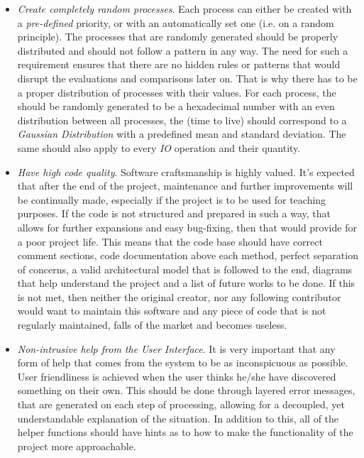 \documentclass{article}
\newcommand{\code}[1]{\codeinline{\texttt{#1}}}
\begin{document}
\begin{itemize}
\item \textit{Create completely random processes}. Each process can either be created with a \textit{pre-defined} priority, or with an automatically set one (i.e. on a random principle). The processes that are randomly generated should be properly distributed and should not follow a pattern in any way. The need for such a requirement ensures that there are no hidden rules or patterns that would disrupt the evaluations and comparisons later on. That is why there has to be a proper distribution of processes with their values. For each process, the \code{ID} should be randomly generated to be a hexadecimal number with an even distribution between all processes, the \code{ttl} (time to live) should correspond to a \textit{Gaussian Distribution} with a predefined mean and standard deviation. The same should also apply to every \textit{IO} operation and their quantity.

\item \textit{Have high code quality}. Software craftsmanship is highly valued. It's expected that after the end of the project, maintenance and further improvements will be continually made, especially if the project is to be used for teaching purposes. If the code is not structured and prepared in such a way, that allows for further expansions and easy bug-fixing, then that would provide for a poor project life. This means that the code base should have correct comment sections, code documentation above each method, perfect separation of concerns, a valid architectural model that is followed to the end, diagrams that help understand the project and a list of future works to be done. If this is not met, then neither the original creator, nor any following contributor would want to maintain this software and any piece of code that is not regularly maintained, falls of the market and becomes useless.

\item \textit{Non-intrusive help from the User Interface}. It is very important that any form of help that comes from the system to be as inconspicuous as possible. User friendliness is achieved when the user thinks he/she have discovered something on their own. This should be done through layered error messages, that are generated on each step of processing, allowing for a decoupled, yet understandable explanation of the situation. In addition to this, all of the helper functions should have hints as to how to make the functionality of the project more approachable.
\end{itemize}
\end{document}
